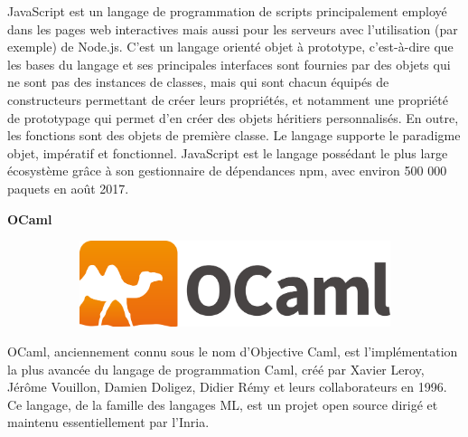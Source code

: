\documentclass{article}
\begin{document}
JavaScript est un langage de programmation de scripts principalement employé dans les pages web interactives mais aussi pour les serveurs avec l'utilisation (par exemple) de Node.js. C'est un langage orienté objet à prototype, c'est-à-dire que les bases du langage et ses principales interfaces sont fournies par des objets qui ne sont pas des instances de classes, mais qui sont chacun équipés de constructeurs permettant de créer leurs propriétés, et notamment une propriété de prototypage qui permet d'en créer des objets héritiers personnalisés. En outre, les fonctions sont des objets de première classe. Le langage supporte le paradigme objet, impératif et fonctionnel. JavaScript est le langage possédant le plus large écosystème grâce à son gestionnaire de dépendances npm, avec environ 500 000 paquets en août 2017.

\newpage
\textbf{OCaml}
\newline
\begin{figure}[h!]
	\centering
  	\begin{subfigure}[b]{0.25\linewidth}
	\includegraphics[width=\linewidth]{ocamlm.png}
  	\end{subfigure}
\end{figure}

OCaml, anciennement connu sous le nom d'Objective Caml, est l'implémentation la plus avancée du langage de programmation Caml, créé par Xavier Leroy, Jérôme Vouillon, Damien Doligez, Didier Rémy et leurs collaborateurs en 1996. Ce langage, de la famille des langages ML, est un projet open source dirigé et maintenu essentiellement par l'Inria.
\newline
\end{document}
